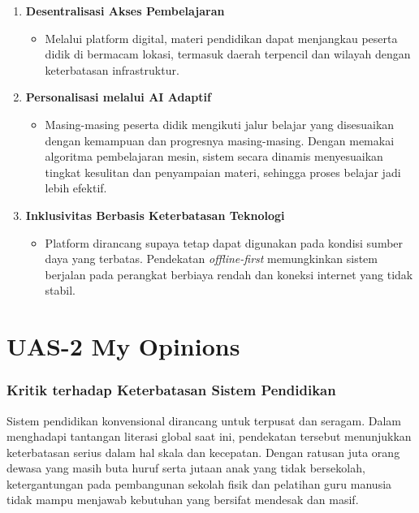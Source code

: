 \documentclass[
  letterpaper,
  DIV=11,
  numbers=noendperiod]{scrreprt}
\providecommand{\tightlist}{%
  \setlength{\itemsep}{0pt}\setlength{\parskip}{0pt}}
\begin{document}
\begin{enumerate}
\def\labelenumi{\arabic{enumi}.}
\tightlist
\item
  \textbf{Desentralisasi Akses Pembelajaran}

  \begin{itemize}
  \tightlist
  \item
    Melalui platform digital, materi pendidikan dapat menjangkau peserta
    didik di bermacam lokasi, termasuk daerah terpencil dan wilayah
    dengan keterbatasan infrastruktur.
  \end{itemize}
\item
  \textbf{Personalisasi melalui AI Adaptif}

  \begin{itemize}
  \tightlist
  \item
    Masing-masing peserta didik mengikuti jalur belajar yang disesuaikan
    dengan kemampuan dan progresnya masing-masing. Dengan memakai
    algoritma pembelajaran mesin, sistem secara dinamis menyesuaikan
    tingkat kesulitan dan penyampaian materi, sehingga proses belajar
    jadi lebih efektif.
  \end{itemize}
\item
  \textbf{Inklusivitas Berbasis Keterbatasan Teknologi}

  \begin{itemize}
  \tightlist
  \item
    Platform dirancang supaya tetap dapat digunakan pada kondisi sumber
    daya yang terbatas. Pendekatan \emph{offline-first} memungkinkan
    sistem berjalan pada perangkat berbiaya rendah dan koneksi internet
    yang tidak stabil.
  \end{itemize}
\end{enumerate}


\chapter{UAS-2 My Opinions}\label{uas-2-my-opinions}

\subsection{Kritik terhadap Keterbatasan Sistem
Pendidikan}\label{kritik-terhadap-keterbatasan-sistem-pendidikan}

Sistem pendidikan konvensional dirancang untuk terpusat dan seragam.
Dalam menghadapi tantangan literasi global saat ini, pendekatan tersebut
menunjukkan keterbatasan serius dalam hal skala dan kecepatan. Dengan
ratusan juta orang dewasa yang masih buta huruf serta jutaan anak yang
tidak bersekolah, ketergantungan pada pembangunan sekolah fisik dan
pelatihan guru manusia tidak mampu menjawab kebutuhan yang bersifat
mendesak dan masif.
\end{document}
